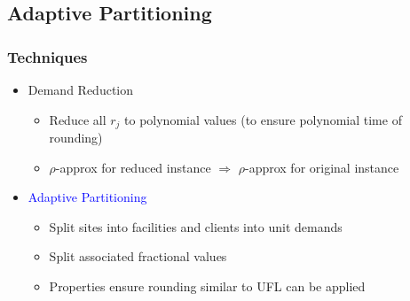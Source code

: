 \documentclass[hyperref,dvipsnames,svgnames,compress]{beamer}
\begin{document}
\subsection[Adaptive Partitioning]{Adaptive Partitioning}
\begin{frame}
  \frametitle{Techniques}
  \begin{itemize}\addtolength{\itemsep}{1\baselineskip}

  \item<0> {\Large {Demand Reduction}}
    \vspace{.1in}
    \begin{itemize}\addtolength{\itemsep}{1\baselineskip}
    \item  {\large Reduce all $r_j$ to polynomial values (to ensure polynomial time of
						rounding)}
    \item  {\large $\rho$-approx for reduced instance $\Rightarrow$ $\rho$-approx for original instance }
    \end{itemize}
    
  \item<1> {\Large \textcolor{blue}{Adaptive Partitioning}}
    \vspace{.1in}
    \begin{itemize}\addtolength{\itemsep}{1\baselineskip}
    \item {\large Split sites into facilities and clients into unit demands}
    \item {\large Split associated fractional values}
    \item {\large Properties ensure rounding similar to UFL can be applied}
    \end{itemize}
  \end{itemize}
\end{frame}

\end{document}
